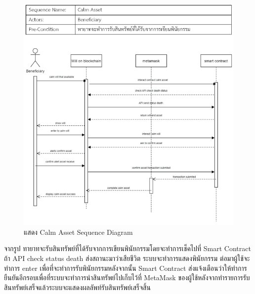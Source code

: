 \documentclass[12pt,oneside,openright,a4paper]{cpe-thai-project}
\begin{document}
\begin{enumerate}[label=\thesubsection.\arabic*,leftmargin=0pt,itemindent=2.5cm]
\begin{figure}[!thb]
			\includegraphics[scale=0.6]{calmAssetseq}
			\caption{แสดง Calm Asset Sequence Diagram}
		\end{figure}
		\FloatBarrier
	\tab จากรูป ทายาทจะรับสินทรัพย์ที่ได้รับจากการเขียนพินัยกรรมโดยจะทำการเช็คไปที่ Smart Contract ถ้า API check status death ส่งสถานะมาว่าเสียชีวิต ระบบจะทำการแสดงพินัยกรรม ต่อมาผู้ใช้จะทำการ enter เพื่อที่จะทำการรับพินัยกรรมหลังจากนั้น Smart Contract ส่งแจ้งเตือนว่าให้ทำการยืนยันอีกรอบเพื่อที่ระบบจะทำการนำสินทรัพย์ไปเก็บไว้ที่ MetaMask ของผู้ใช้หลังจากทำรายการรับสินทรัพย์เสร็จแล้วระบบจะแสดงผลลัพท์รับสินทรัพย์เสร็จสิ้น
	\end{enumerate}
\end{document}
